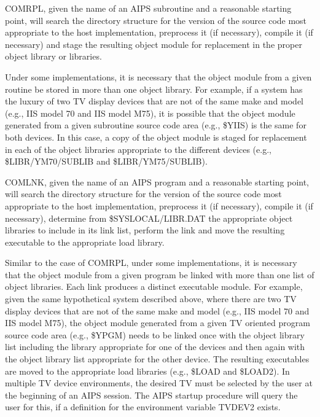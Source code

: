 COMRPL, given the name of an AIPS subroutine and a reasonable starting
point, will search the directory structure for the version of the
source code most appropriate to the host implementation, preprocess it
(if necessary), compile it (if necessary) and stage the resulting
object module for replacement in the proper object library or
libraries.

Under some implementations, it is necessary that the object module
from a given routine be stored in more than one object library.  For
example, if a system has the luxury of two TV display devices that are
not of the same make and model (e.g., IIS model 70 and IIS model M75),
it is possible that the object module generated from a given
subroutine source code area (e.g., \$YIIS) is the same for both
devices.  In this case, a copy of the object module is staged for
replacement in each of the object libraries appropriate to the
different devices (e.g., \$LIBR/YM70/SUBLIB and \$LIBR/YM75/SUBLIB).

COMLNK, given the name of an AIPS program and a reasonable starting
point, will search the directory structure for the version of the
source code most appropriate to the host implementation, preprocess it
(if necessary), compile it (if necessary), determine from
\$SYSLOCAL/LIBR.DAT the appropriate object libraries to include in its
link list, perform the link and move the resulting executable to the
appropriate load library.

Similar to the case of COMRPL, under some implementations, it is
necessary that the object module from a given program be linked with
more than one list of object libraries.  Each link produces a distinct
executable module.  For example, given the same hypothetical system
described above, where there are two TV display devices that are not
of the same make and model (e.g., IIS model 70 and IIS model M75), the
object module generated from a given TV oriented program source code
area (e.g., \$YPGM) needs to be linked once with the object library
list including the library appropriate for one of the devices and then
again with the object library list appropriate for the other device.
The resulting executables are moved to the appropriate load libraries
(e.g., \$LOAD and \$LOAD2).  In multiple TV device environments, the
desired TV must be selected by the user at the beginning of an AIPS
session.  The AIPS startup procedure will query the user for this, if
a definition for the environment variable TVDEV2 exists.


